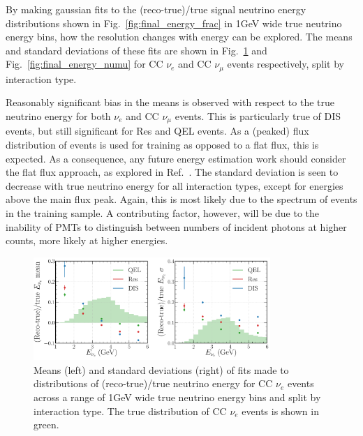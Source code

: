 By making gaussian fits to the (reco-true)/true signal neutrino energy distributions shown in
Fig.~\ref{fig:final_energy_frac} in \unit{1}{GeV} wide true neutrino energy bins, how the
resolution changes with energy can be explored. The means and standard deviations of these fits
are shown in Fig.~\ref{fig:final_energy_nuel} and Fig.~\ref{fig:final_energy_numu} for CC
$\nu_{e}$ and CC $\nu_{\mu}$ events respectively, split by interaction type.

Reasonably significant bias in the means is observed with respect to the true neutrino energy for
both $\nu_{e}$ and CC $\nu_{\mu}$ events. This is particularly true of DIS events, but still
significant for Res and QEL events. As a (peaked) flux distribution of events is used for training
as opposed to a flat flux, this is expected. As a consequence, any future energy estimation work
should consider the flat flux approach, as explored in Ref.~\cite{baldi2019}. The standard
deviation is seen to decrease with true neutrino energy for all interaction types, except for
energies above the main flux peak. Again, this is most likely due to the spectrum of events in the
training sample. A contributing factor, however, will be due to the inability of PMTs to
distinguish between numbers of incident photons at higher counts, more likely at higher energies.

\begin{figure} %
    \includegraphics[width=0.8\textwidth]{diagrams/6-cvn/chipsnet/final_energy_nuel.pdf}
    \caption[Means and standard deviations of fits to $\nu_{e}$ energy distributions.]
    {Means (left) and standard deviations (right) of fits made to distributions of
        (reco-true)/true neutrino energy for CC $\nu_{e}$ events across a range of \unit{1}{GeV}
        wide true neutrino energy bins and split by interaction type. The true distribution of CC
        $\nu_{e}$ events is shown in green.}
    \label{fig:final_energy_nuel}
\end{figure}

